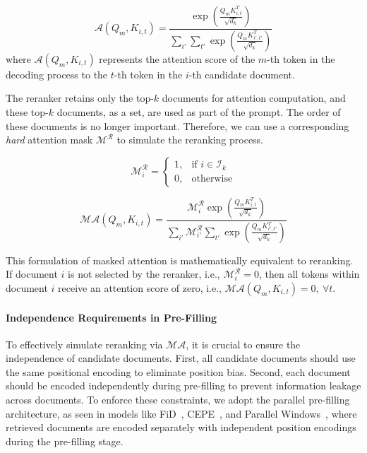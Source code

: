 \begin{equation}\label{eq: original attn}
    \mathcal{A}(Q_m, K_{i,t}) = \frac{\exp \left(\frac{Q_m K_{i,t}^T}{\sqrt{d_k}}\right)}{\sum_{i'} \sum_{t'} \exp \left(\frac{Q_m K_{i',t'}^T}{\sqrt{d_k}}\right)}
\end{equation}
where $\mathcal{A}(Q_m, K_{i,t})$ represents the attention score of the $m$-th token in the decoding process to the $t$-th token in the $i$-th candidate document.

The reranker retains only the top-\( k \) documents for attention computation, and these top-\( k \) documents, as a set, are used as part of the prompt. The order of these documents is no longer important. Therefore, we can use a corresponding \textit{hard} attention mask \( \mathcal{M}^{\mathcal{R}} \) to simulate the reranking process.

\begin{equation}\label{eq: hard attention mask}
    \mathcal{M}^{\mathcal{R}}_i = \begin{cases}
        1, & \text{if } i \in \mathcal{I}_k \\
        0, & \text{otherwise}
    \end{cases}
\end{equation}

\begin{equation}
    \mathcal{MA}(Q_m, K_{i,t}) = \frac{\mathcal{M}^{\mathcal{R}}_i \exp \left(\frac{Q_m K_{i,t}^T}{\sqrt{d_k}}\right)}{\sum_{i'} \mathcal{M}^{\mathcal{R}}_{i'} \sum_{t'} \exp \left(\frac{Q_m K_{i',t'}^T}{\sqrt{d_k}}\right)}
\end{equation}

This formulation of masked attention is mathematically equivalent to reranking. If document $i$ is not selected by the reranker, i.e., $\mathcal{M}^{\mathcal{R}}_i = 0$, then all tokens within document $i$ receive an attention score of zero, i.e., $\mathcal{MA}(Q_m, K_{i,t}) = 0,~ \forall t$.

\paragraph{Independence Requirements in Pre-Filling} 
To effectively simulate reranking via $\mathcal{MA}$, it is crucial to ensure the independence of candidate documents. First, all candidate documents should use the same positional encoding to eliminate position bias. Second, each document should be encoded independently during pre-filling to prevent information leakage across documents. To enforce these constraints, we adopt the parallel pre-filling architecture, as seen in models like FiD~\cite{DBLP:conf/eacl/IzacardG21}, CEPE~\cite{DBLP:conf/acl/YenG024}, and Parallel Windows~\cite{DBLP:conf/acl/RatnerLBRMAKSLS23}, where retrieved documents are encoded separately with independent position encodings during the pre-filling stage.

